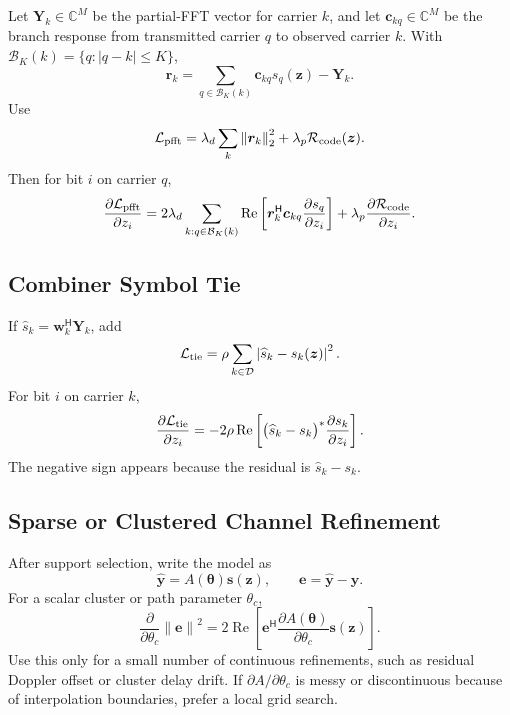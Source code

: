 \documentclass[11pt]{article}
\newcommand{\C}{\mathbb C}
\newcommand{\Hh}{^{\mathsf H}}
\newcommand{\norm}[1]{\left\lVert #1 \right\rVert}
\newcommand{\abs}[1]{\left\lvert #1 \right\rvert}
\newcommand{\Ree}{\operatorname{Re}}
\begin{document}
Let $\bm Y_k\in\C^M$ be the partial-FFT vector for carrier $k$, and let
$\bm c_{kq}\in\C^M$ be the branch response from transmitted carrier $q$ to
observed carrier $k$.  With $\mathcal B_K(k)=\{q:\abs{q-k}\le K\}$,
\begin{equation}
  \bm r_k
  =
  \sum_{q\in\mathcal B_K(k)}\bm c_{kq}s_q(\bm z)-\bm Y_k.
\end{equation}
Use
\begin{equation}
  \mathcal L_{\rm pfft}
  =
  \lambda_d\sum_k\norm{\bm r_k}_2^2
  +\lambda_p\mathcal R_{\rm code}(\bm z).
\end{equation}
Then for bit $i$ on carrier $q$,
\begin{equation}
  \frac{\partial \mathcal L_{\rm pfft}}{\partial z_i}
  =
  2\lambda_d
  \sum_{k:q\in\mathcal B_K(k)}
  \Ree\left[
    \bm r_k\Hh\bm c_{kq}\frac{\partial s_q}{\partial z_i}
  \right]
  +\lambda_p
  \frac{\partial\mathcal R_{\rm code}}{\partial z_i}.
  \label{eq:pfft_gradient}
\end{equation}

\subsection{Combiner Symbol Tie}

If $\widehat s_k=\bm w_k\Hh\bm Y_k$, add
\begin{equation}
  \mathcal L_{\rm tie}
  =
  \rho\sum_{k\in\mathcal D}\abs{\widehat s_k-s_k(\bm z)}^2 .
\end{equation}
For bit $i$ on carrier $k$,
\begin{equation}
  \frac{\partial \mathcal L_{\rm tie}}{\partial z_i}
  =
  -2\rho\Ree\left[
    \big(\widehat s_k-s_k\big)^*
    \frac{\partial s_k}{\partial z_i}
  \right].
  \label{eq:tie_gradient}
\end{equation}
The negative sign appears because the residual is $\widehat s_k-s_k$.

\subsection{Sparse or Clustered Channel Refinement}

After support selection, write the model as
\begin{equation}
  \widehat{\bm y}=A(\bm\theta)\bm s(\bm z),\qquad
  \bm e=\widehat{\bm y}-\bm y.
\end{equation}
For a scalar cluster or path parameter $\theta_c$,
\begin{equation}
  \frac{\partial}{\partial\theta_c}\norm{\bm e}^2
  =
  2\Ree\left[
    \bm e\Hh
    \frac{\partial A(\bm\theta)}{\partial\theta_c}
    \bm s(\bm z)
  \right].
  \label{eq:theta_gradient}
\end{equation}
Use this only for a small number of continuous refinements, such as residual
Doppler offset or cluster delay drift.  If $\partial A/\partial\theta_c$ is
messy or discontinuous because of interpolation boundaries, prefer a local grid
search.
\end{document}
